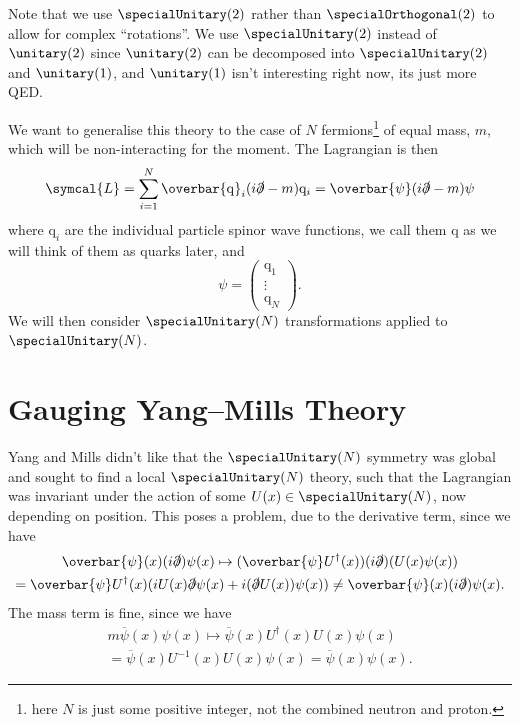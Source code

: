 \documentclass[fleqn]{NotesClass}
\newcommand{\Pparticle}[1]{\mathrm{#1}}
\newcommand{\Pq}{\ensuremath{\Pparticle{q}}}
\newcommand{\diracadjoint}[1]{\overbar{#1}}
\newcommand{\hermit}{\dagger}
\newcommand{\lagrangianDensity}{\symcal{L}}
\begin{document}
    Note that we use \(\specialUnitary(2)\) rather than \(\specialOrthogonal(2)\) to allow for complex \enquote{rotations}.
    We use \(\specialUnitary(2)\) instead of \(\unitary(2)\) since \(\unitary(2)\) can be decomposed into \(\specialUnitary(2)\) and \(\unitary(1)\), and \(\unitary(1)\) isn't interesting right now, its just more QED.
    
    We want to generalise this theory to the case of \(N\) fermions\footnote{here \(N\) is just some positive integer, not the combined neutron and proton.} of equal mass, \(m\), which will be non-interacting for the moment.
    The Lagrangian is then
    \begin{equation}
        \lagrangianDensity = \sum_{i=1}^{N} \diracadjoint{\Pq}_i(i\slashed{\partial} - m)\Pq_i = \diracadjoint{\psi}(i \slashed{\partial} - m)\psi
    \end{equation}
    where \(\Pq_i\) are the individual particle spinor wave functions, we call them \(\Pq\) as we will think of them as quarks later, and
    \begin{equation}
        \psi = 
        \begin{pmatrix}
            \Pq_1\\ \vdots\\ \Pq_N
        \end{pmatrix}
        .
    \end{equation}
    We will then consider \(\specialUnitary(N)\) transformations applied to \(\specialUnitary(N)\).
    
    \section{Gauging Yang--Mills Theory}
    Yang and Mills didn't like that the \(\specialUnitary(N)\) symmetry was global and sought to find a local \(\specialUnitary(N)\) theory, such that the Lagrangian was invariant under the action of some \(U(x) \in \specialUnitary(N)\), now depending on position.
    This poses a problem, due to the derivative term, since we have
    \begin{multline}
        \diracadjoint{\psi}(x)(i\slashed{\partial})\psi(x) \mapsto (\diracadjoint{\psi}U^{\hermit}(x))(i\slashed{\partial})(U(x)\psi(x))\\
        = \diracadjoint{\psi}U^{\hermit}(x)(iU(x)\slashed{\partial}\psi(x) + i(\slashed{\partial}U(x))\psi(x)) \ne \diracadjoint{\psi}(x)(i\slashed{\partial})\psi(x).
    \end{multline}
    The mass term is fine, since we have
    \begin{multline}
        m\diracadjoint{\psi}(x)\psi(x) \mapsto \diracadjoint{\psi}(x)U^{\hermit}(x)U(x)\psi(x)\\
        = \diracadjoint{\psi}(x)U^{-1}(x)U(x)\psi(x) = \diracadjoint{\psi}(x)\psi(x).
    \end{multline}
    
\end{document}
